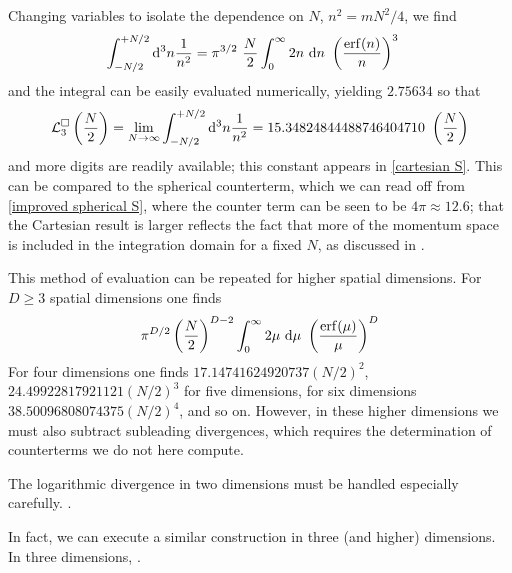 Changing variables to isolate the dependence on $N$, $n^2 = m N^2/4$, we find
\begin{align}
    \int_{-N/2}^{+N/2} \mathrm{d}^3n \frac{1}{n^2}
    &=
    \pi^{3/2}\ \frac{N}{2} \int_{0}^\infty 2n\ \mathrm{d}n\ \left(\frac{\erf(n)}{n}\right)^3
\end{align}
and the integral can be easily evaluated numerically, yielding $2.75634$ so that
\begin{equation}
    \counterterm^\cartesian_3 \left(\frac{N}{2}\right) = \lim_{N\goesto\infty}\int_{-N/2}^{+N/2} \mathrm{d}^3n \frac{1}{n^2} = 15.34824844488746404710\ \left(\frac{N}{2}\right)
\end{equation}
and more digits are readily available; this constant appears in \eqref{cartesian S}.
This can be compared to the spherical counterterm, which we can read off from \eqref{improved spherical S}, where the counter term can be seen to be $4\pi \approx 12.6 $; that the Cartesian result is larger reflects the fact that more of the momentum space is included in the integration domain for a fixed $N$, as discussed in .

This method of evaluation can be repeated for higher spatial dimensions.
For $D\geq3$ spatial dimensions one finds
\begin{equation}
    \pi^{D/2} \left(\frac{N}{2}\right)^{D-2} \int_0^\infty 2\mu\ \mathrm{d}\mu\ \left(\frac{\erf(\mu)}{\mu}\right)^D
\end{equation}
For four dimensions one finds $17.14741624920737 (N/2)^2$, $24.49922817921121 (N/2)^3$ for five dimensions, for six dimensions $38.50096808074375 (N/2)^4$, and so on.  However, in these higher dimensions we must also subtract subleading divergences, which requires the determination of counterterms we do not here compute.

The logarithmic divergence in two dimensions must be handled especially carefully.
.

In fact, we can execute a similar construction in three (and higher) dimensions.  In three dimensions, .
